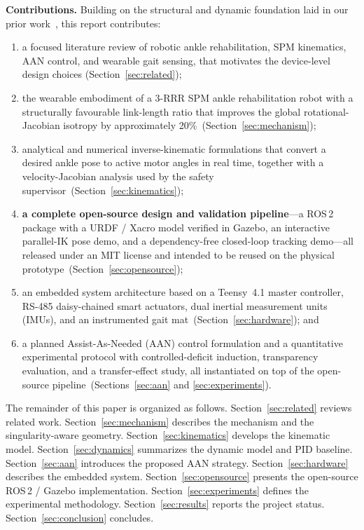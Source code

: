 \documentclass[conference]{IEEEtran}
\begin{document}
\textbf{Contributions.} Building on the structural and dynamic foundation laid in our prior work~\cite{zhang2025rehab}, this report contributes:
\begin{enumerate}[leftmargin=*]
\item a focused literature review of robotic ankle rehabilitation, SPM kinematics, AAN control, and wearable gait sensing, that motivates the device-level design choices (Section~\ref{sec:related});
\item the wearable embodiment of a 3-RRR SPM ankle rehabilitation robot with a structurally favourable link-length ratio that improves the global rotational-Jacobian isotropy by approximately 20\%~(Section~\ref{sec:mechanism});
\item analytical and numerical inverse-kinematic formulations that convert a desired ankle pose to active motor angles in real time, together with a velocity-Jacobian analysis used by the safety supervisor~(Section~\ref{sec:kinematics});
\item \textbf{a complete open-source design and validation pipeline}---a ROS\,2 package with a URDF / Xacro model verified in Gazebo, an interactive parallel-IK pose demo, and a dependency-free closed-loop tracking demo---all released under an MIT license and intended to be reused on the physical prototype~(Section~\ref{sec:opensource});
\item an embedded system architecture based on a Teensy~4.1 master controller, RS-485 daisy-chained smart actuators, dual inertial measurement units (IMUs), and an instrumented gait mat~(Section~\ref{sec:hardware}); and
\item a planned Assist-As-Needed (AAN) control formulation and a quantitative experimental protocol with controlled-deficit induction, transparency evaluation, and a transfer-effect study, all instantiated on top of the open-source pipeline~(Sections~\ref{sec:aan} and \ref{sec:experiments}).
\end{enumerate}

The remainder of this paper is organized as follows. Section~\ref{sec:related} reviews related work. Section~\ref{sec:mechanism} describes the mechanism and the singularity-aware geometry. Section~\ref{sec:kinematics} develops the kinematic model. Section~\ref{sec:dynamics} summarizes the dynamic model and PID baseline. Section~\ref{sec:aan} introduces the proposed AAN strategy. Section~\ref{sec:hardware} describes the embedded system. Section~\ref{sec:opensource} presents the open-source ROS\,2 / Gazebo implementation. Section~\ref{sec:experiments} defines the experimental methodology. Section~\ref{sec:results} reports the project status. Section~\ref{sec:conclusion} concludes.
\end{document}
